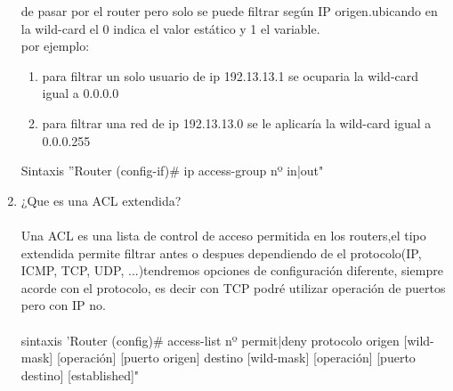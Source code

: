 \documentclass{udparticle}
\begin{document}
\begin{enumerate}
de pasar por el router pero solo se puede filtrar según IP origen.ubicando en la wild-card el 0 indica el valor estático 
y 1 el variable.\\
por ejemplo:
\begin{enumerate}
\item para filtrar un solo usuario de ip 192.13.13.1 se ocuparia la wild-card igual a 0.0.0.0
\item para filtrar una red de ip 192.13.13.0 se le aplicaría la wild-card igual a 0.0.0.255
\end{enumerate}
Sintaxis ''Router (config-if)# ip access-group nº in|out"
\item ¿Que es una ACL extendida?\\\\
Una ACL es una lista de control de acceso 
permitida en los routers,el tipo extendida 
permite filtrar antes o despues
dependiendo de el protocolo(IP, ICMP, TCP, 
UDP, ...)tendremos opciones de 
configuración diferente, siempre acorde con
el protocolo, es decir con TCP podré 
utilizar operación de puertos pero con IP 
no.\\\\
sintaxis 'Router (config)# access-list nº 
permit|deny protocolo origen [wild-mask] 
[operación] [puerto origen] destino 
[wild-mask] 
[operación] [puerto destino] [established]"


\end{enumerate}
\end{document}
